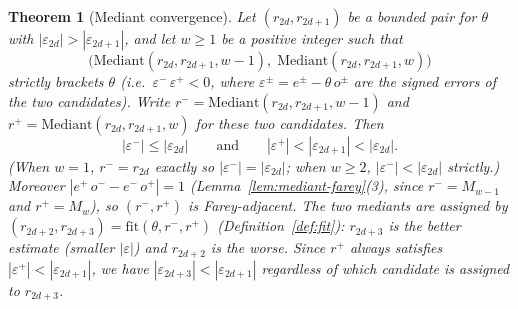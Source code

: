 \documentclass[12pt]{article}
\newtheorem{theorem}{Theorem}[section]
\theoremstyle{definition}
\theoremstyle{remark}
\theoremstyle{plain}
\newcommand{\eps}{\varepsilon}
\newcommand{\rplus}{r^{+}}
\newcommand{\rminus}{r^{-}}
\newcommand{\eplus}{e^{+}}
\newcommand{\eminus}{e^{-}}
\newcommand{\odenp}{o^{+}}
\newcommand{\odenm}{o^{-}}
\newcommand{\epsplus}{\eps^{+}}
\newcommand{\epsminus}{\eps^{-}}
\begin{document}
\begin{theorem}[Mediant convergence]
\label{thm:mediant-convergence}
Let $(r_{2d}, r_{2d+1})$ be a bounded pair for $\theta$ with
$|\eps_{2d}| > |\eps_{2d+1}|$, and let $w \geq 1$ be a positive integer such that
\[
  \bigl(\mathrm{Mediant}(r_{2d}, r_{2d+1}, w-1),\;
         \mathrm{Mediant}(r_{2d}, r_{2d+1}, w)\bigr)
\]
strictly brackets $\theta$ (i.e.\ $\eps^-\,\eps^+ < 0$, where
$\eps^\pm = e^\pm - \theta\, o^\pm$ are the signed errors of the two candidates).
Write $\rminus = \mathrm{Mediant}(r_{2d}, r_{2d+1}, w-1)$ and
$\rplus = \mathrm{Mediant}(r_{2d}, r_{2d+1}, w)$ for these two candidates.
Then
\[
  |\epsminus| \leq |\eps_{2d}| \qquad \text{and} \qquad |\epsplus| < |\eps_{2d+1}| < |\eps_{2d}|.
\]
(When $w = 1$, $\rminus = r_{2d}$ exactly so $|\epsminus| = |\eps_{2d}|$; when $w \geq 2$,
$|\epsminus| < |\eps_{2d}|$ strictly.)
Moreover $|\eplus\,\odenm - \eminus\,\odenp| = 1$ (Lemma~\ref{lem:mediant-farey}(3), since $\rminus = M_{w-1}$ and $\rplus = M_w$), so $(\rminus, \rplus)$ is Farey-adjacent.
The two mediants are assigned by
$(r_{2d+2}, r_{2d+3}) = \mathrm{fit}(\theta, \rminus, \rplus)$
(Definition~\ref{def:fit}): $r_{2d+3}$ is the better estimate (smaller $|\eps|$)
and $r_{2d+2}$ is the worse.
Since $\rplus$ always satisfies $|\epsplus| < |\eps_{2d+1}|$, we have
$|\eps_{2d+3}| < |\eps_{2d+1}|$ regardless of which candidate is assigned to $r_{2d+3}$.
\end{theorem}
\end{document}
